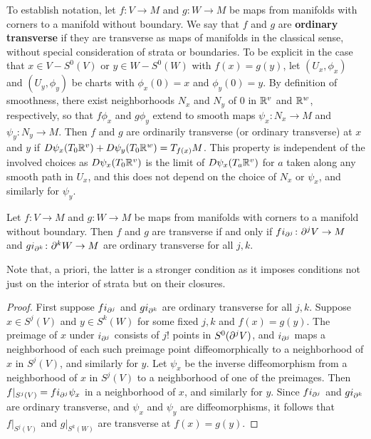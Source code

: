 \begin{remark}
To establish notation, let $f \colon V\to M$ and $g \colon W\to M$ be maps from manifolds with corners to a manifold without boundary.
We say that $f$ and $g$ are \textbf{ordinary transverse} if they are transverse as maps of manifolds in the classical sense, without special consideration of strata or boundaries.
To be explicit in the case that $x\in V-S^0(V)$ or $y\in W-S^0(W)$ with $f(x)=g(y)$, let $(U_x,\phi_x)$ and $(U_y,\phi_y)$ be charts with $\phi_x(0)=x$ and $\phi_y(0)=y$.
By definition of smoothness, there exist neighborhoods $N_x$ and $N_y$ of $0$ in $\mathbb{R}^v$ and $\mathbb{R}^w$, respectively, so that $f\phi_x$ and $g\phi_y$ extend to smooth maps $\psi_x \colon N_x\to M$ and $\psi_y \colon N_y\to M$.
Then $f$ and $g$ are ordinarily transverse (or ordinary transverse)
at $x$ and $y$ if $D\psi_x(T_0 \mathbb{R}^v)+D\psi_y(T_0\mathbb{R}^w)=T_{f(x)}M$.
This property is independent of the involved choices as $D\psi_x(T_0 \mathbb{R}^v)$ is the limit of $D\psi_x(T_{a} \mathbb{R}^v)$ for $a$ taken along any smooth path in $U_x$, and this does not depend on the choice of $N_x$ or $\psi_x$, and similarly for $\psi_y$.

\begin{lemma}\label{L: simple trans}
	Let $f \colon V\to M$ and $g \colon W\to M$ be maps from manifolds with corners to a manifold without boundary.
	Then $f$ and $g$ are transverse if and only if $fi_{\partial^j} \colon \partial^jV\to M$ and $gi_{\partial^k} \colon \partial^kW \to M$ are ordinary transverse for all $j,k$.
\end{lemma}

Note that, a priori, the latter is a stronger condition as it imposes conditions not just on the interior of strata but on their closures.

\begin{proof}
	First suppose $fi_{\partial^j}$ and $gi_{\partial^k}$ are ordinary transverse for all $j,k$.
	Suppose $x\in S^j(V)$ and $y\in S^k(W)$ for some fixed $j,k$ and $f(x)=g(y)$.
	The preimage of $x$ under $i_{\partial^j}$ consists of $j!$ points in $S^0(\partial^jV)$, and $i_{\partial^j}$ maps a neighborhood of each such preimage point diffeomorphically to a neighborhood of $x$ in $S^j(V)$, and similarly for $y$.
	Let $\psi_x$ be the inverse diffeomorphism from a neighborhood of $x$ in $S^j(V)$ to a neighborhood of one of the preimages.
	Then $f|_{S^j(V)}=fi_{\partial^j}\psi_x$ in a neighborhood of $x$, and similarly for $y$.
	Since $fi_{\partial^j}$ and $gi_{\partial^k}$ are ordinary transverse, and $\psi_x$ and $\psi_y$ are diffeomorphisms, it follows that $f|_{S^j(V)}$ and $g|_{S^k(W)}$ are transverse at $f(x)=g(y)$.


\end{proof}
\end{remark}
